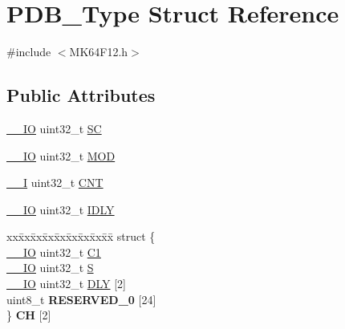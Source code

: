 \hypertarget{structPDB__Type}{}\section{P\+D\+B\+\_\+\+Type Struct Reference}
\label{structPDB__Type}


{\ttfamily \#include $<$M\+K64\+F12.\+h$>$}

\subsection*{Public Attributes}
\begin{DoxyCompactItemize}
\item 
\hyperlink{core__sc300_8h_aec43007d9998a0a0e01faede4133d6be}{\+\_\+\+\_\+\+IO} uint32\+\_\+t \hyperlink{structPDB__Type_a27b752c3fb14fa47cda9b911dda18eb5}{SC}
\item 
\hyperlink{core__sc300_8h_aec43007d9998a0a0e01faede4133d6be}{\+\_\+\+\_\+\+IO} uint32\+\_\+t \hyperlink{structPDB__Type_ae69113e63275302871696253eb33d1aa}{M\+OD}
\item 
\hyperlink{core__sc300_8h_af63697ed9952cc71e1225efe205f6cd3}{\+\_\+\+\_\+I} uint32\+\_\+t \hyperlink{structPDB__Type_ac0196244d0c47eaf8fb40c53a3babd8e}{C\+NT}
\item 
\hyperlink{core__sc300_8h_aec43007d9998a0a0e01faede4133d6be}{\+\_\+\+\_\+\+IO} uint32\+\_\+t \hyperlink{structPDB__Type_a0cc0a5fd26a50498ff744ccfc90425a9}{I\+D\+LY}
\item 
\begin{tabbing}
xx\=xx\=xx\=xx\=xx\=xx\=xx\=xx\=xx\=\kill
struct \{\\
\>\hyperlink{core__sc300_8h_aec43007d9998a0a0e01faede4133d6be}{\_\_IO} uint32\_t \hyperlink{structPDB__Type_a08fc04ae996dc8dcbb0d61921b486a68}{C1}\\
\>\hyperlink{core__sc300_8h_aec43007d9998a0a0e01faede4133d6be}{\_\_IO} uint32\_t \hyperlink{structPDB__Type_ac3e33b249de9772accd3ea93c70ea9a3}{S}\\
\>\hyperlink{core__sc300_8h_aec43007d9998a0a0e01faede4133d6be}{\_\_IO} uint32\_t \hyperlink{structPDB__Type_a313f3125147793d214f81d5bb45f04c3}{DLY} \mbox{[}2\mbox{]}\\
\>uint8\_t {\bfseries RESERVED\_0} \mbox{[}24\mbox{]}\\
\} {\bfseries CH} \mbox{[}2\mbox{]}\hypertarget{structPDB__Type_a54a8479b87b96de97d39df78edaad857}{}\label{structPDB__Type_a54a8479b87b96de97d39df78edaad857}
\\


\end{tabbing}
\end{DoxyCompactItemize}
